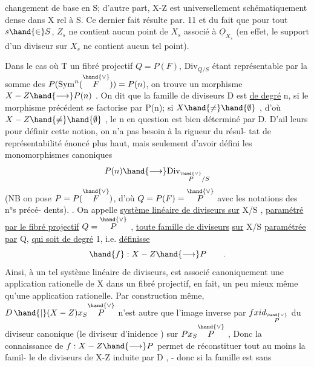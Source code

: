changement de base en S; d'autre part, X-Z  est universellement
schématiquement dense dans X rel à S. Ce dernier fait résulte  %
 par. 11 et du fait que pour tout $s \hand{\in} S$,
$Z_s$ ne contient aucun point de $X_s$ associé à $\underline{O}_{X_s}$ (en effet, le support d'un
diviseur  sur $X_s$ ne contient aucun tel point).

Dans le cas où T  un fibré projectif $Q=P(F)$, $\mathrm{Div}_{Q/S}$
étant représentable par la somme des $P(\mathrm{Sym}^n(\overset{\hand{\vee}}{F})) = P(n)$, on trouve
un morphisme $X-Z \hand{\longrightarrow} P(n)$ . On dit que la famille de diviseurs
D est \uline{de degré} n, si le morphisme précédent se factorise par P(n); si
$X \hand{\neq} \hand{\emptyset}$ , d'où $X-Z \hand{\neq} \hand{\emptyset}$ , le n en question est bien déterminé par D. D'ail%
leurs pour définir cette notion, on n'a pas besoin à la rigueur du résul-%
tat de représentabilité énoncé plus haut, mais seulement d'avoir défini
les monomorphismes canoniques
\[ P(n) \hand{\longrightarrow} \mathrm{Div}_{\overset{\hand{\vee}}{P}/S} \]
(NB on pose $P = P(\overset{\hand{\vee}}{F})$, d'où $Q = P(F) = \overset{\hand{\vee}}{P}$ avec les notations des n°s précé-%
dents). . On appelle \uline{système linéaire de diviseurs sur} X/S , \uline{paramétré
par le fibré projectif} $Q = \overset{\hand{\vee}}{P}$ , \uline{toute famille de diviseurs} \uline{sur} X/S
\uline{paramétrée par} Q, \uline{qui soit de degré} 1, i.e. \uline{définisse}
\[ \hand{f} : X-Z \hand{\longrightarrow} P \qquad . \]
Ainsi, à un tel système  linéaire de diviseurs, est associé canoniquement
une application rationelle de X dans un fibré projectif, \hand{(}en fait, un peu
mieux même qu'une application rationelle\hand{)}. Par construction même,
$D\,\hand{|}(X-Z)x_S\overset{\hand{\vee}}{P}$ n'est autre que l'image inverse par $f x id_{\overset{\hand{\vee}}{P}}$ du diviseur
canonique (le diviseur d'inidence ) sur $Px_S\overset{\hand{\vee}}{P}$ , Donc la connaissance
de $f: X-Z \hand{\longrightarrow} P$ permet de réconstituer  tout au moins la famil-%
le de diviseurs de X-Z induite par D , - donc si la famille est sans
